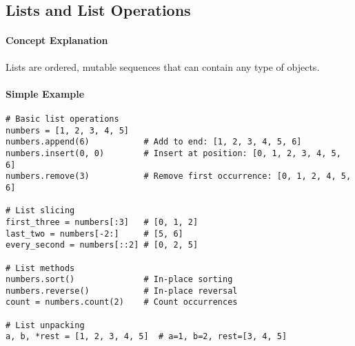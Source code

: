 \subsection{Lists and List Operations}

\paragraph{Concept Explanation}
Lists are ordered, mutable sequences that can contain any type of objects.

\paragraph{Simple Example}
\begin{lstlisting}[caption=List Examples]
# Basic list operations
numbers = [1, 2, 3, 4, 5]
numbers.append(6)           # Add to end: [1, 2, 3, 4, 5, 6]
numbers.insert(0, 0)        # Insert at position: [0, 1, 2, 3, 4, 5, 6]
numbers.remove(3)           # Remove first occurrence: [0, 1, 2, 4, 5, 6]

# List slicing
first_three = numbers[:3]   # [0, 1, 2]
last_two = numbers[-2:]     # [5, 6]
every_second = numbers[::2] # [0, 2, 5]

# List methods
numbers.sort()              # In-place sorting
numbers.reverse()           # In-place reversal
count = numbers.count(2)    # Count occurrences

# List unpacking
a, b, *rest = [1, 2, 3, 4, 5]  # a=1, b=2, rest=[3, 4, 5]
\end{lstlisting}

